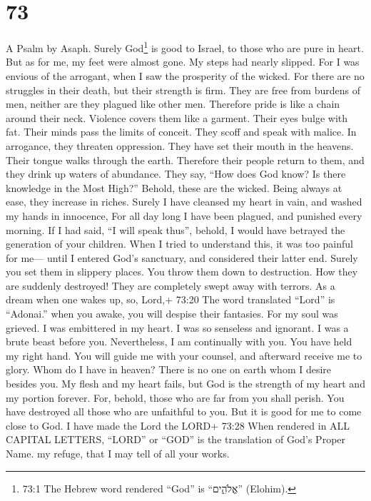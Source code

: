 \hypertarget{section-71}{%
\section{73}\label{section-71}}

A Psalm by Asaph.  Surely God\footnote{73:1 The Hebrew word
  rendered ``God'' is ``אֱלֹהִ֑ים'' (Elohim).} is good to Israel, to
those who are pure in heart.  But as for me, my feet were
almost gone. My steps had nearly slipped.  For I was envious
of the arrogant, when I saw the prosperity of the wicked. 
For there are no struggles in their death, but their strength is firm.
 They are free from burdens of men, neither are they plagued
like other men.  Therefore pride is like a chain around
their neck. Violence covers them like a garment.  Their eyes
bulge with fat. Their minds pass the limits of conceit. 
They scoff and speak with malice. In arrogance, they threaten
oppression.  They have set their mouth in the heavens. Their
tongue walks through the earth.  Therefore their people
return to them, and they drink up waters of abundance. 
They say, ``How does God know? Is there knowledge in the Most High?''
 Behold, these are the wicked. Being always at ease, they
increase in riches.  Surely I have cleansed my heart in
vain, and washed my hands in innocence,  For all day long I
have been plagued, and punished every morning.  If I had
said, ``I will speak thus'', behold, I would have betrayed the
generation of your children.  When I tried to understand
this, it was too painful for me---  until I entered God's
sanctuary, and considered their latter end.  Surely you set
them in slippery places. You throw them down to destruction.
 How they are suddenly destroyed! They are completely swept
away with terrors.  As a dream when one wakes up, so,
Lord,+ 73:20 The word translated ``Lord'' is ``Adonai.'' when you awake,
you will despise their fantasies.  For my soul was grieved.
I was embittered in my heart.  I was so senseless and
ignorant. I was a brute beast before you.  Nevertheless, I
am continually with you. You have held my right hand.  You
will guide me with your counsel, and afterward receive me to glory.
 Whom do I have in heaven? There is no one on earth whom I
desire besides you.  My flesh and my heart fails, but God
is the strength of my heart and my portion forever.  For,
behold, those who are far from you shall perish. You have destroyed all
those who are unfaithful to you.  But it is good for me to
come close to God. I have made the Lord the LORD+ 73:28 When rendered in
ALL CAPITAL LETTERS, ``LORD'' or ``GOD'' is the translation of God's
Proper Name. my refuge, that I may tell of all your works.


